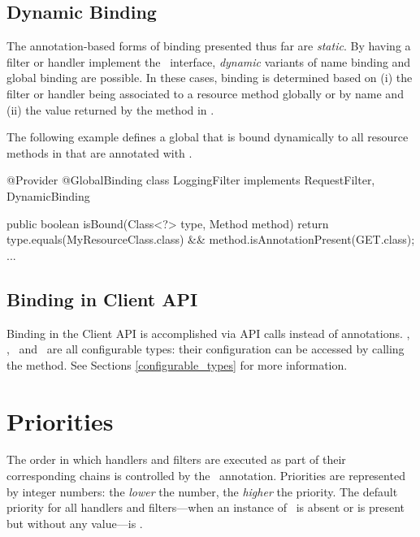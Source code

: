 \subsection{Dynamic Binding}

The annotation-based forms of binding presented thus far are {\em static}.  By having a filter or handler implement the \DynamicBinding\ interface, {\em dynamic} variants of name binding and global binding are possible. In these cases, binding is determined based on (i) the filter or handler being associated to a resource method globally or by name and (ii) the value returned by the  method in \DynamicBinding. 

The following example defines a global  that is bound dynamically to all resource methods in  that are annotated with .

\begin{listing}{1}
@Provider
@GlobalBinding
class LoggingFilter implements RequestFilter, DynamicBinding {

    public boolean isBound(Class<?> type, Method method) {
        return type.equals(MyResourceClass.class) 
            && method.isAnnotationPresent(GET.class);    
    }
    ...
}
\end{listing}



\subsection{Binding in Client API}
\label{binding_in_client_api}

Binding in the Client API is accomplished via API calls instead of annotations. \Client, \Invocation, \InvocationBuilder\ and \Target\ are all configurable types: their configuration can be accessed by calling the  method. See Sections \ref{configurable_types} for more information.

\section{Priorities}
\label{priorities}

The order in which handlers and filters are executed as part of their corresponding chains is controlled by the \BindingPriority\ annotation.
Priorities are represented by integer numbers: the \emph{lower} the number, the \emph{higher} the priority. The default priority for all handlers and filters---when an instance of \BindingPriority\ is absent or is present but without any value---is . 

